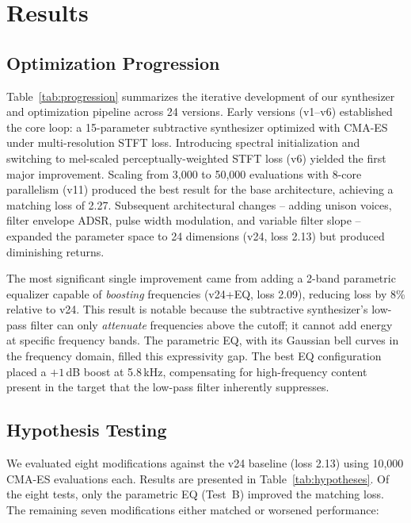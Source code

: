 \section{Results}
\label{sec:results}

\subsection{Optimization Progression}

Table~\ref{tab:progression} summarizes the iterative development of our synthesizer and optimization pipeline across 24 versions.
Early versions (v1--v6) established the core loop: a 15-parameter subtractive synthesizer optimized with CMA-ES under multi-resolution STFT loss.
Introducing spectral initialization and switching to mel-scaled perceptually-weighted STFT loss (v6) yielded the first major improvement.
Scaling from 3{,}000 to 50{,}000 evaluations with 8-core parallelism (v11) produced the best result for the base architecture, achieving a matching loss of 2.27.
Subsequent architectural changes -- adding unison voices, filter envelope ADSR, pulse width modulation, and variable filter slope -- expanded the parameter space to 24 dimensions (v24, loss 2.13) but produced diminishing returns.

The most significant single improvement came from adding a 2-band parametric equalizer capable of \emph{boosting} frequencies (v24+EQ, loss 2.09), reducing loss by 8\% relative to v24.
This result is notable because the subtractive synthesizer's low-pass filter can only \emph{attenuate} frequencies above the cutoff; it cannot add energy at specific frequency bands.
The parametric EQ, with its Gaussian bell curves in the frequency domain, filled this expressivity gap.
The best EQ configuration placed a $+1$\,dB boost at 5.8\,kHz, compensating for high-frequency content present in the target that the low-pass filter inherently suppresses.

\subsection{Hypothesis Testing}

We evaluated eight modifications against the v24 baseline (loss 2.13) using 10{,}000 CMA-ES evaluations each.
Results are presented in Table~\ref{tab:hypotheses}.
Of the eight tests, only the parametric EQ (Test~B) improved the matching loss.
The remaining seven modifications either matched or worsened performance:


